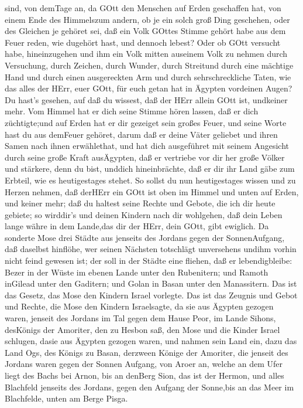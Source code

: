 sind, von demTage an, da GOtt den Menschen auf Erden geschaffen hat, von
einem Ende des Himmelszum andern, ob je ein solch groß Ding geschehen,
oder des Gleichen je gehöret sei,  daß ein Volk GOttes
Stimme gehört habe aus dem Feuer reden, wie dugehört hast, und dennoch
lebest?  Oder ob GOtt versucht habe, hineinzugehen und ihm
ein Volk mitten auseinem Volk zu nehmen durch Versuchung, durch Zeichen,
durch Wunder, durch Streitund durch eine mächtige Hand und durch einen
ausgereckten Arm und durch sehrschreckliche Taten, wie das alles der
HErr, euer GOtt, für euch getan hat in Ägypten vordeinen Augen?
 Du hast's gesehen, auf daß du wissest, daß der HErr allein
GOtt ist, undkeiner mehr.  Vom Himmel hat er dich seine
Stimme hören lassen, daß er dich züchtigte;und auf Erden hat er dir
gezeiget sein großes Feuer, und seine Worte hast du aus demFeuer
gehöret,  darum daß er deine Väter geliebet und ihren Samen
nach ihnen erwählethat, und hat dich ausgeführet mit seinem Angesicht
durch seine große Kraft ausÄgypten,  daß er vertriebe vor
dir her große Völker und stärkere, denn du bist, unddich hineinbrächte,
daß er dir ihr Land gäbe zum Erbteil, wie es heutigestages stehet.
 So sollst du nun heutigestages wissen und zu Herzen
nehmen, daß derHErr ein GOtt ist oben im Himmel und unten auf Erden, und
keiner mehr;  daß du haltest seine Rechte und Gebote, die
ich dir heute gebiete; so wirddir's und deinen Kindern nach dir
wohlgehen, daß dein Leben lange währe in dem Lande,das dir der HErr,
dein GOtt, gibt ewiglich.  Da sonderte Mose drei Städte aus
jenseits des Jordans gegen der SonnenAufgang,  daß daselbst
hinflöhe, wer seinen Nächsten totschlägt unversehens undihm vorhin nicht
feind gewesen ist; der soll in der Städte eine fliehen, daß er
lebendigbleibe:  Bezer in der Wüste im ebenen Lande unter
den Rubenitern; und Ramoth inGilead unter den Gaditern; und Golan in
Basan unter den Manassitern.  Das ist das Gesetz, das Mose
den Kindern Israel vorlegte.  Das ist das Zeugnis und Gebot
und Rechte, die Mose den Kindern Israelsagte, da sie aus Ägypten gezogen
waren,  jenseit des Jordans im Tal gegen dem Hause Peor, im
Lande Sihons, desKönigs der Amoriter, den zu Hesbon saß, den Mose und
die Kinder Israel schlugen, dasie aus Ägypten gezogen waren,
 und nahmen sein Land ein, dazu das Land Ogs, des Königs zu
Basan, derzween Könige der Amoriter, die jenseit des Jordans waren gegen
der Sonnen Aufgang,  von Aroer an, welche an dem Ufer liegt
des Bachs bei Arnon, bis an denBerg Sion, das ist der Hermon,
 und alles Blachfeld jenseits des Jordans, gegen den
Aufgang der Sonne,bis an das Meer im Blachfelde, unten am Berge Pisga.

